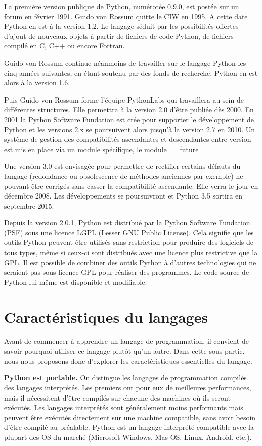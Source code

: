 \documentclass[12pt, a4paper]{article}
\begin{document}
La première version publique de Python, numérotée 0.9.0, est postée sur un forum en février 1991. Guido von Rossum quitte le CIW en 1995. A cette date Python en est à la version 1.2. Le langage séduit par les possibilités offertes d'ajout de nouveaux objets à partir de fichiers de code Python, de fichiers compilé en C, C++ ou encore Fortran.

Guido von Rossum continue néanmoins de travailler sur le langage Python les cinq années suivantes, en étant soutenu par des fonds de recherche. Python en est alors à la version 1.6.

Puis Guido von Rossum forme l'équipe PythonLabs qui travaillera au sein de différentes structures. Elle permettra à la version 2.0 d'être publiée dès 2000. En 2001 la Python Software Fundation est crée pour supporter le développement de Python et les versions 2.x se poursuivent alors jusqu'à la version 2.7 en 2010. Un système de gestion des compatibilités ascendantes et descendantes entre version est mis en place via un module spécifique, le module \_\_future\_\_.

Une version 3.0  est envisagée pour permettre de rectifier certains défauts du langage (redondance ou obsolescence de méthodes anciennes par exemple) ne pouvant être corrigés sans casser la compatibilité ascendante. Elle verra le jour en décembre 2008. Les développements se poursuivront et Python 3.5 sortira en septembre 2015. 

Depuis la version 2.0.1, Python est distribué par la Python Software Fundation (PSF) sous une licence LGPL (Lesser GNU Public License). Cela signifie que les outils Python peuvent être utilisés sans restriction pour produire des logiciels de tous types, même si ceux-ci sont distribués avec une licence plus restrictive que la GPL. Il est possible de combiner des outils Python à d'autres technologies qui ne seraient pas sous licence GPL pour réaliser des programmes. Le code source de Python lui-même est disponible et modifiable.


\section{Caractéristiques du langages}
Avant de commencer à apprendre un langage de programmation, il convient de savoir pourquoi utiliser ce langage plutôt qu'un autre. Dans cette sous-partie, nous nous proposons donc d'explorer les caractéristiques essentielles du langage.

\textbf{Python est portable.} On distingue les langages de programmation compilés des langages interprétés. Les premiers ont pour eux de meilleures performances, mais il nécessitent d'être compilés sur chacune des machines où ils seront exécutés. Les langages interprétés sont généralement moins performants mais peuvent être exécutés directement sur une machine compatible, sans avoir besoin d'être compilé au préalable. Python est un langage interprété compatible avec la plupart des OS du marché (Microsoft Windows, Mas OS, Linux, Android, etc.).
\end{document}
